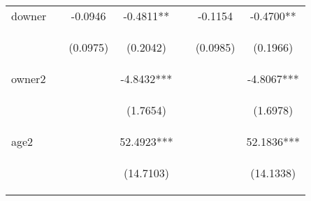 \begin{center}
\begin{tabular}{lcccccc}
downer &  & -0.0946 & -0.4811** &  & -0.1154 & -0.4700** \\
\vspace{4pt} & \begin{footnotesize}\end{footnotesize} & \begin{footnotesize}(0.0975)\end{footnotesize} & \begin{footnotesize}(0.2042)\end{footnotesize} & \begin{footnotesize}\end{footnotesize} & \begin{footnotesize}(0.0985)\end{footnotesize} & \begin{footnotesize}(0.1966)\end{footnotesize} \\
owner2 &  &  & -4.8432*** &  &  & -4.8067*** \\
\vspace{4pt} & \begin{footnotesize}\end{footnotesize} & \begin{footnotesize}\end{footnotesize} & \begin{footnotesize}(1.7654)\end{footnotesize} & \begin{footnotesize}\end{footnotesize} & \begin{footnotesize}\end{footnotesize} & \begin{footnotesize}(1.6978)\end{footnotesize} \\
age2 &  &  & 52.4923*** &  &  & 52.1836*** \\
\vspace{4pt} & \begin{footnotesize}\end{footnotesize} & \begin{footnotesize}\end{footnotesize} & \begin{footnotesize}(14.7103)\end{footnotesize} & \begin{footnotesize}\end{footnotesize} & \begin{footnotesize}\end{footnotesize} & \begin{footnotesize}(14.1338)\end{footnotesize} \\

\end{tabular}
\end{center}
